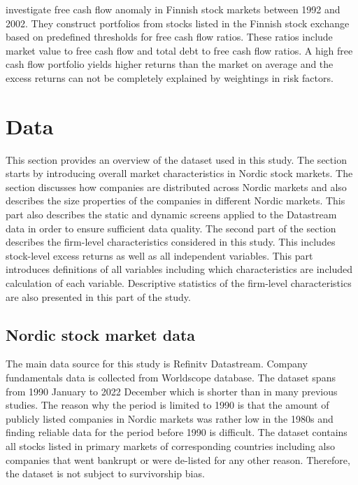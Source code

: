 \documentclass[12pt]{article}
\begin{document}
\citet{jokipii2006free} investigate free cash flow anomaly in Finnish stock markets between 1992 and 2002. They construct portfolios from stocks listed in the Finnish stock exchange based on predefined thresholds for free cash flow ratios. These ratios include market value to free cash flow and total debt to free cash flow ratios. A high free cash flow portfolio yields higher returns than the market on average and the excess returns can not be completely explained by weightings in \citet{FAMA19933} risk factors. \par

\section{Data}\label{Data}

This section provides an overview of the dataset used in this study. The section starts by introducing overall market characteristics in Nordic stock markets. The section discusses how companies are distributed across Nordic markets and also describes the size properties of the companies in different Nordic markets. This part also describes the static and dynamic screens applied to the Datastream data in order to ensure sufficient data quality. The second part of the section describes the firm-level characteristics considered in this study. This includes stock-level excess returns as well as all independent variables. This part introduces definitions of all variables including which characteristics are included calculation of each variable. Descriptive statistics of the firm-level characteristics are also presented in this part of the study. \par

\subsection{Nordic stock market data}\label{NordicStockMarketData}

The main data source for this study is Refinitv Datastream. Company fundamentals data is collected from Worldscope database. The dataset spans from 1990 January to 2022 December which is shorter than in many previous studies. The reason why the period is limited to 1990 is that the amount of publicly listed companies in Nordic markets was rather low in the 1980s and finding reliable data for the period before 1990 is difficult. The dataset contains all stocks listed in primary markets of corresponding countries including also companies that went bankrupt or were de-listed for any other reason. Therefore, the dataset is not subject to survivorship bias. \par
\end{document}

